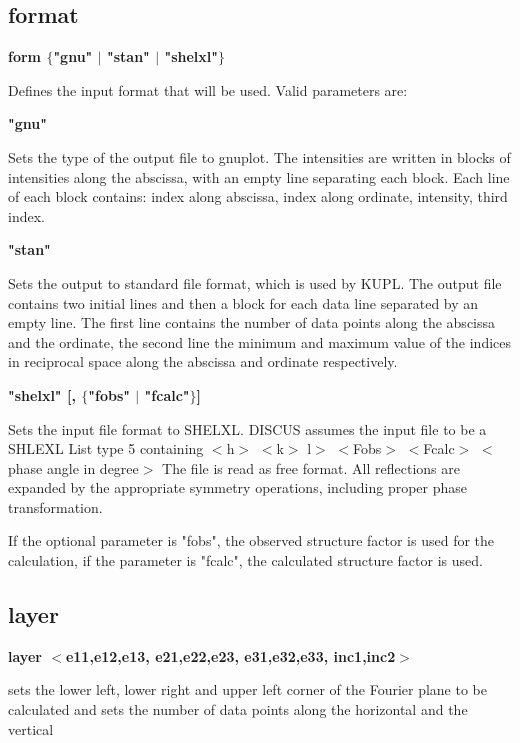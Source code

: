 \subsection*{format}
{\bf form $ \{$"gnu" $| $ "stan" $| $ "shelxl"$\} $ \par }
\par
\vspace{3pt}
Defines the input format that will be used. 
Valid parameters are: 
\par
{\bf "gnu" \par }
\vspace{3pt}
Sets the type of the output file to gnuplot. The intensities are 
written in blocks of intensities along the abscissa, with an empty 
line separating each block. Each line of each block contains: 
index along abscissa, index along ordinate, intensity, third index. 
\par
{\bf "stan" \par }
\vspace{3pt}
Sets the output to standard file format, which is used by KUPL. 
The output file contains two initial lines and then a block for each 
data line separated by an empty line. The first line contains the 
number of data points along the abscissa and the ordinate, the 
second line the minimum and maximum value of the indices in reciprocal 
space along the abscissa and ordinate respectively. 
\par
{\bf "shelxl" [, $ \{$"fobs" $| $ "fcalc"$\} $] \par }
\vspace{3pt}
Sets the input file format to SHELXL. DISCUS assumes the input file 
to be a SHLEXL List type 5 containing 
$ <$h$> $ $ <$k$> $ l$> $ $ <$Fobs$> $ $ <$Fcalc$> $ $ <$phase angle in degree$> $ 
The file is read as free format. All reflections are expanded by the 
appropriate symmetry operations, including proper phase transformation. 
\par
If the optional parameter is "fobs", the observed structure factor is 
used for the calculation, if the parameter is "fcalc", the calculated 
structure factor is used. 
\par
\subsection*{layer}
{\bf layer $ <$e11,e12,e13, e21,e22,e23, e31,e32,e33, inc1,inc2$> $ \par }
\par
\vspace{3pt}
sets the lower left, lower right and upper left corner of the 
Fourier plane to be calculated and sets the number of data 
points along the horizontal and the vertical 
